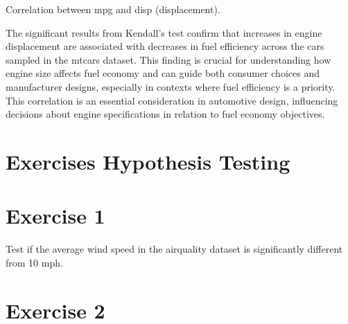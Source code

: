 \documentclass[
]{book}
\newenvironment{Shaded}{\begin{snugshade}}{\end{snugshade}}
\newcommand{\AttributeTok}[1]{\textcolor[rgb]{0.13,0.29,0.53}{#1}}
\newcommand{\CommentTok}[1]{\textcolor[rgb]{0.56,0.35,0.01}{\textit{#1}}}
\newcommand{\FunctionTok}[1]{\textcolor[rgb]{0.13,0.29,0.53}{\textbf{#1}}}
\newcommand{\NormalTok}[1]{#1}
\newcommand{\SpecialCharTok}[1]{\textcolor[rgb]{0.81,0.36,0.00}{\textbf{#1}}}
\newcommand{\StringTok}[1]{\textcolor[rgb]{0.31,0.60,0.02}{#1}}
\begin{document}
Correlation between mpg and disp (displacement).

\begin{Shaded}
\end{Shaded}

The significant results from Kendall's test confirm that increases in engine displacement are associated with decreases in fuel efficiency across the cars sampled in the mtcars dataset. This finding is crucial for understanding how engine size affects fuel economy and can guide both consumer choices and manufacturer designs, especially in contexts where fuel efficiency is a priority. This correlation is an essential consideration in automotive design, influencing decisions about engine specifications in relation to fuel economy objectives.

\section*{Exercises Hypothesis Testing}\label{exercises-hypothesis-testing}

\section*{Exercise 1}\label{exercise-1-7}

Test if the average wind speed in the airquality dataset is significantly different from 10 mph.

\section*{Exercise 2}\label{exercise-2-6}
\end{document}
